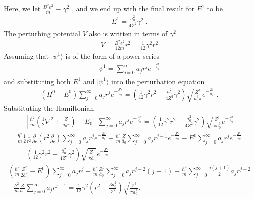     \noindent Here, we let $\frac{B^2 e^2}{m} \equiv \gamma^2$ \cite{Killingbeck_1979}, and we end up with the final result for $E^1$ to be 
    \begin{align}
        E^1 = \frac{\bar{a}_0^2}{4Z^2} \gamma^2\;.
    \end{align}
    \noindent The perturbing potential $V$ also is written in terms of $\gamma^2$
    \begin{align}
        V = \frac{B^2 e^2}{12m} r^2 = \frac{1}{12} \gamma^2 r^2
    \end{align}
    \noindent Assuming that $\vert \psi^1 \rangle$ is of the form of a power series 
    \begin{align}
        \psi^1 = \sum_{j = 0}^\infty a_j r^j e^{-\frac{Zr}{\bar{a}_0}}
    \end{align}
    \noindent and substituting both $E^1$ and $\vert \psi^1 \rangle$ into the perturbation equation
    \begin{align}
        \left(H^0 - E^0 \right) \sum_{j = 0}^\infty  a_j r^j e^{-\frac{Zr}{\bar{a}_0}} = \left( \frac{1}{12} \gamma^2 r^2 - \frac{\bar{a}_0^2}{4Z^2} \gamma^2 \right) \sqrt{\frac{Z^3}{\bar{a}_0^3 \pi}} e^{-\frac{Zr}{\bar{a}_0}}\;.
    \end{align}
    \noindent Substituting the Hamiltonian 
    \begin{align*}
        \left[ \frac{\hbar^2}{m} \left(\frac{1}{2}\nabla^2 + \frac{Z}{\bar{a}_0 r}\right) - E_0\right] \sum_{j = 0}^\infty a_j r^j e^{-\frac{Zr}{\bar{a_0}}} = \left( \frac{1}{12} \gamma^2 r^2 - \frac{\bar{a}_0^2}{4Z^2} \gamma^2 \right) \sqrt{\frac{Z^3}{\pi \bar{a}_0^3}} e^{-\frac{Zr}{\bar{a}_0}}
    \end{align*}
    \begin{align*}
        \frac{\hbar^2}{m}\frac{1}{2} \frac{1}{r^2} \frac{\partial}{\partial r} \left(r^2 \frac{\partial}{\partial r} \right) \sum_{j = 0}^\infty a_j r^j e^{-\frac{Zr}{\bar{a}_0}} + \frac{\hbar^2}{m}\frac{Z}{\bar{a}_0} \sum_{j = 0}^\infty a_j r^{j - 1} e^{-\frac{Zr}{\bar{a}_0}} - E^0 \sum_{j = 0}^\infty a_j r^j e^{-\frac{Zr}{\bar{a}_0}} \nonumber\\ = \left( \frac{1}{12} \gamma^2 r^2 - \frac{\bar{a}_0^2}{4Z^2} \gamma^2 \right) \sqrt{\frac{Z^3}{\pi \bar{a}_0^3}} e^{-\frac{Zr}{\bar{a}_0}}\;.
    \end{align*}
    \begin{align*}
        \left( \frac{\hbar^2}{m}\frac{Z^2}{2 \bar{a}_0^2} - E^0\right) \sum_{j = 0}^\infty a_j r^j - \frac{\hbar^2}{m}\frac{Zr}{\bar{a}_0} \sum_{j = 0}^\infty a_j r^{j -2} (j + 1) + \frac{\hbar^2}{m}\sum_{j = 0}^\infty \frac{j(j+1)}{2} a_j r^{j - 2} \nonumber\\+ \frac{\hbar^2}{m}\frac{Z}{\bar{a}_0} \sum_{j = 0}^\infty a_j r^{j -1} = \frac{1}{12} \gamma^2 \left(r^2 - \frac{3 \bar{a}_0^2}{Z^2} \right) \sqrt{\frac{Z^3}{\pi \bar{a}_0^3}}.
    \end{align*}
